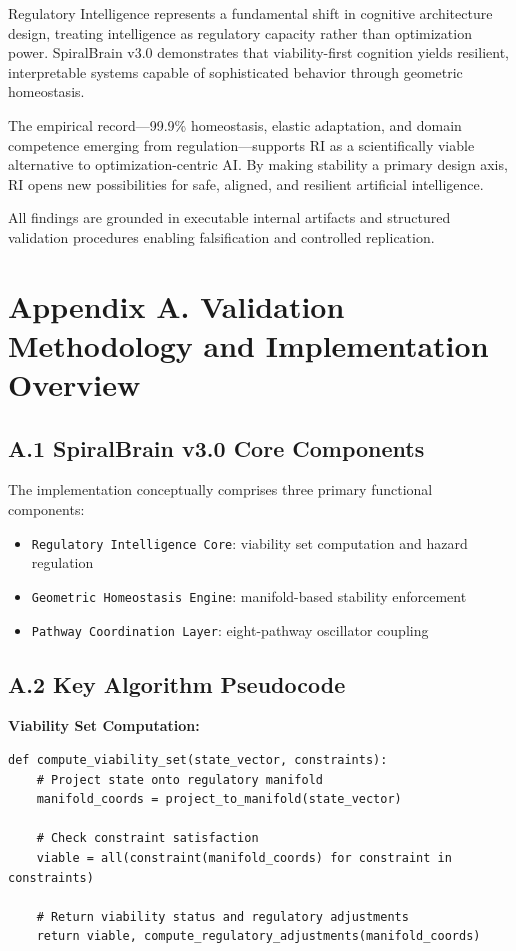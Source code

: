 \documentclass[12pt,a4paper]{report}
\begin{document}
Regulatory Intelligence represents a fundamental shift in cognitive architecture design, treating intelligence as regulatory capacity rather than optimization power. SpiralBrain v3.0 demonstrates that viability-first cognition yields resilient, interpretable systems capable of sophisticated behavior through geometric homeostasis.

The empirical record—99.9\% homeostasis, elastic adaptation, and domain competence emerging from regulation—supports RI as a scientifically viable alternative to optimization-centric AI. By making stability a primary design axis, RI opens new possibilities for safe, aligned, and resilient artificial intelligence.

All findings are grounded in executable internal artifacts and structured validation procedures enabling falsification and controlled replication.

\appendix
\section*{Appendix A. Validation Methodology and Implementation Overview}

\subsection*{A.1 SpiralBrain v3.0 Core Components}

The implementation conceptually comprises three primary functional components:

\begin{itemize}
    \item \texttt{Regulatory Intelligence Core}: viability set computation and hazard regulation
    \item \texttt{Geometric Homeostasis Engine}: manifold-based stability enforcement
    \item \texttt{Pathway Coordination Layer}: eight-pathway oscillator coupling
\end{itemize}

\subsection*{A.2 Key Algorithm Pseudocode}

\textbf{Viability Set Computation:}
\begin{verbatim}
def compute_viability_set(state_vector, constraints):
    # Project state onto regulatory manifold
    manifold_coords = project_to_manifold(state_vector)
    
    # Check constraint satisfaction
    viable = all(constraint(manifold_coords) for constraint in constraints)
    
    # Return viability status and regulatory adjustments
    return viable, compute_regulatory_adjustments(manifold_coords)
\end{verbatim}
\end{document}
